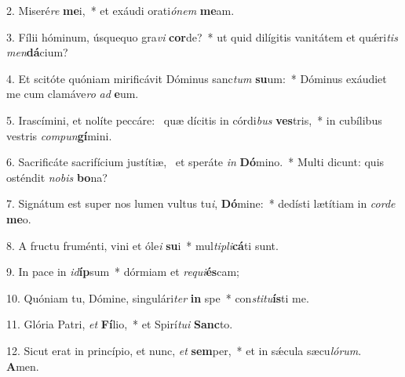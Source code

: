 2. Miseré\textit{re} \textbf{me}i,~*  et exáudi orati\textit{ó}\textit{nem} \textbf{me}am.\

3. Fílii hóminum, úsquequo gra\textit{vi} \textbf{cor}de?~*  ut quid dilígitis vanitátem et quǽri\textit{tis} \textit{men}\textbf{dá}cium?\

4. Et scitóte quóniam mirificávit Dóminus sanc\textit{tum} \textbf{su}um:~*  Dóminus exáudiet me cum clamáve\textit{ro} \textit{ad} \textbf{e}um.\

5. Irascímini, et nolíte peccáre: \dag\  quæ dícitis in córdi\textit{bus} \textbf{ves}tris,~*  in cubílibus vestris \textit{com}\textit{pun}\textbf{gí}mini.\

6. Sacrificáte sacrifícium justítiæ, \dag\  et speráte \textit{in} \textbf{Dó}mino.~*  Multi dicunt: quis osténdit \textit{no}\textit{bis} \textbf{bo}na?\

7. Signátum est super nos lumen vultus tu\textit{i}, \textbf{Dó}mine:~*  dedísti lætítiam in \textit{cor}\textit{de} \textbf{me}o.\

8. A fructu fruménti, vini et óle\textit{i} \textbf{su}i~*  mul\textit{ti}\textit{pli}\textbf{cá}ti sunt.\

9. In pace in \textit{id}\textbf{íp}sum~*  dórmiam et \textit{re}\textit{qui}\textbf{és}cam;\

10. Quóniam tu, Dómine, singulári\textit{ter} \textbf{in} spe~*  con\textit{sti}\textit{tu}\textbf{ís}ti me.\

11. Glória Patri, \textit{et} \textbf{Fí}lio,~*  et Spirí\textit{tu}\textit{i} \textbf{Sanc}to.\

12. Sicut erat in princípio, et nunc, \textit{et} \textbf{sem}per,~*  et in sǽcula sæcu\textit{ló}\textit{rum}. \textbf{A}men.\

